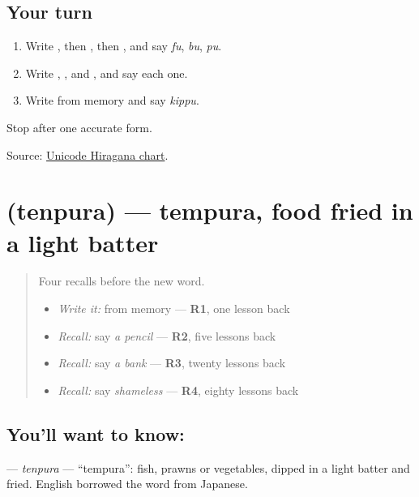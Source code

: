 \subsection*{Your turn}
\begin{enumerate}
\raggedright
  \item Write \textbf{}, then \textbf{}, then \textbf{}, and say \emph{fu}, \emph{bu}, \emph{pu}.
  \item Write \textbf{}, \textbf{}, \textbf{} and \textbf{}, and say each one.
  \item Write \textbf{} from memory and say \emph{kippu}.
\end{enumerate}

\begin{tcolorbox}[breakable,colback=teal!4,colframe=teal!35!black,title={Before you move on}]
Stop after one accurate form.

Source: \href{https://www.unicode.org/charts/PDF/U3040.pdf}{Unicode Hiragana chart}.
\end{tcolorbox}
\section[\texorpdfstring{\ja{てんぷら} (tenpura)}{てんぷら (tenpura)}]{ (tenpura) — tempura, food fried in a light batter}

\label{lesson:JA-C137-tenpura}



\begin{quote}
Four recalls before the new word.

\begin{itemize}
\raggedright
  \item \emph{Write it:} \textbf{} from memory — \textbf{R1}, one lesson back
  \item \emph{Recall:} say \emph{a pencil} — \textbf{R2}, five lessons back
  \item \emph{Recall:} say \emph{a bank} — \textbf{R3}, twenty lessons back
  \item \emph{Recall:} say \emph{shameless} — \textbf{R4}, eighty lessons back
\end{itemize}
\end{quote}

\subsection*{You'll want to know: }
\textbf{} — \emph{tenpura} — \textquotedblleft{}tempura\textquotedblright{}: fish, prawns or vegetables, dipped in a light batter and fried. English borrowed the word from Japanese.

